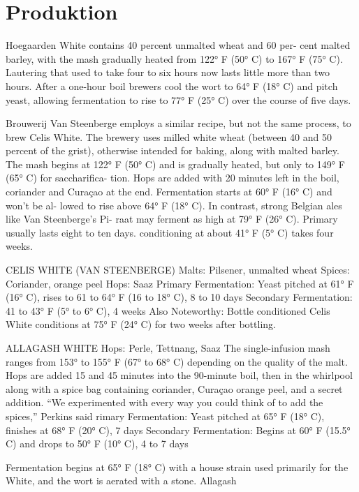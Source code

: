 \documentclass[a4paper,parskip=half]{scrartcl}
\begin{document}
\section*{Produktion}

\parencite[52]{Hieronymus2010}
Hoegaarden White contains 40 percent unmalted wheat and 60 per-
cent malted barley, with the mash gradually heated from 122° F (50° C)
to 167° F (75° C). Lautering that used to take four to six hours now lasts
little more than two hours. After a one-hour boil brewers cool the wort
to 64° F (18° C) and pitch yeast, allowing fermentation to rise to 77°
F (25° C) over the course of five days.

\parencite[52-53]{Hieronymus2010}
Brouwerij Van Steenberge employs a similar recipe, but not the
same process, to brew Celis White. The brewery uses milled white
wheat (between 40 and 50 percent of the grist), otherwise intended for
baking, along with malted barley. The mash begins at 122° F (50° C)
and is gradually heated, but only to 149° F (65° C) for saccharifica-
tion. Hops are added with 20 minutes left in the boil, coriander and
Curaçao at the end. Fermentation starts at
60° F (16° C) and won’t be al-
lowed to rise above 64° F (18°
C). In contrast, strong Belgian
ales like Van Steenberge’s Pi-
raat may ferment as high at 79°
F (26° C). Primary usually lasts
eight to ten days. conditioning at about 41° F (5° C) takes four weeks.

\parencite[53-54]{Hieronymus2010}
CELIS WHITE (VAN STEENBERGE)
Malts: Pilsener, unmalted wheat
Spices: Coriander, orange peel
Hops: Saaz
Primary Fermentation: Yeast pitched at 61° F (16° C), rises to 61 to 64° F (16
to 18° C), 8 to 10 days
Secondary Fermentation: 41 to 43° F (5° to 6° C), 4 weeks
Also Noteworthy: Bottle conditioned
Celis White conditions at 75° F (24° C) for two weeks after bottling.

\parencite[56-58]{Hieronymus2010}
ALLAGASH WHITE
Hops: Perle, Tettnang, Saaz
The single-infusion mash ranges from 153° to 155° F (67° to 68° C)
depending on the quality of the malt. Hops are added 15 and 45 minutes
into the 90-minute boil, then in the whirlpool along with a spice bag
containing coriander, Curaçao orange peel, and a secret addition. “We
experimented with every way you could think of to add the spices,”
Perkins said
rimary Fermentation: Yeast pitched at 65° F (18° C), finishes at 68° F (20°
C), 7 days
Secondary Fermentation: Begins at 60° F (15.5° C) and drops to 50° F (10°
C), 4 to 7 days

Fermentation begins at 65° F (18° C) with a house strain used
primarily for the White, and the wort is aerated with a stone. Allagash
\end{document}
